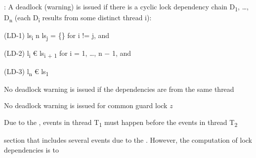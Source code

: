 \documentclass[landscape, a4paper]{article}
\begin{document}
\begin{minipage}[t]{0.19\linewidth}
\begin{betterlist}
		\adjustbox{scale=0.5}{
            \begin{dnumberedcodebox}[minted language=text,minted options={autogobble, fontsize=\large}, box align=top]
            acq(t,y) {
                Ds = Ds U { (t,y,ls(t)) } if ls(t) != emptyset
                ls(t) = ls(t) U {y}
            }
            rel(t,y) {
                ls(t) = ls(t) \ {y}
            }
            fork(t1,t2) {
            }
            ...
            \end{dnumberedcodebox}
		}
		\item {}: A deadlock (warning) is issued if there is a cyclic lock dependency chain D\textsubscript{1}, \ldots, D\textsubscript{n} (each D\textsubscript{i} results from some distinct thread i):
		\begin{betterlist}
			\item (LD-1) ls\textsubscript{i} n ls\textsubscript{j} = \{\} for i != j, and
			\item (LD-2) l\textsubscript{i} € ls\textsubscript{i + 1} for i = 1, \ldots, n − 1, and
			\item (LD-3) l\textsubscript{n} € ls\textsubscript{1}
		\end{betterlist}
		\item {}
		\begin{betterlist}
			\item No deadlock warning is issued if the dependencies are from the same thread
			\item No deadlock warning is issued for common guard lock $z$
			\item {} Due to the , events in thread T\textsubscript{1} must happen before the events in thread T\textsubscript{2}
			\item {}  section that includes several events due to the . However, the computation of lock dependencies is  to 
		\end{betterlist}
	\end{betterlist}

\end{minipage}
\end{document}
